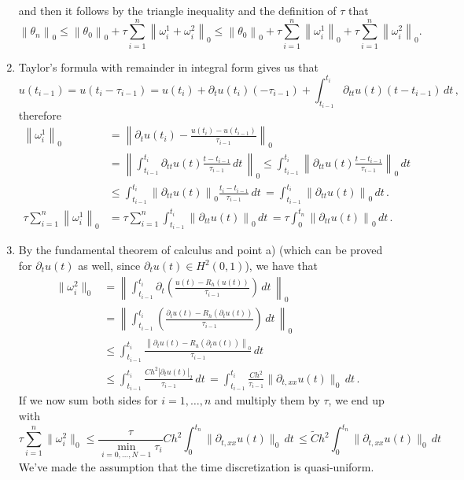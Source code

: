 \documentclass[a4paper]{article}
\newcommand{\dt}{\, dt \,}
\newcommand{\norm}[1]{\left\lVert #1 \right\rVert}
\begin{document}
\begin{enumerate}[label=\textbf{\alph*)},leftmargin=*]
\[	\]
	and then it follows by the triangle inequality and the definition of $\tau$ that
	\[
	\norm{\theta_n}_0
	\leq \norm{\theta_0}_0 + \tau\sum_{i=1}^n \norm{\omega_i^1 + \omega_i^2}_0
	\leq \norm{\theta_0}_0 + \tau\sum_{i=1}^n \norm{\omega_i^1}_0
		+ \tau\sum_{i=1}^n \norm{\omega_i^2}_0.
	\]
\item Taylor's formula with remainder in integral form gives us that
	\[
	u(t_{i-1})
	= u(t_i-\tau_{i-1})
	= u(t_i) + \partial_t u(t_i)(-\tau_{i-1})
		+ \int_{t_{i-1}}^{t_i} \partial_{tt} u(t) (t-t_{i-1}) \dt,
	\]
	therefore
	\begin{align*}
	\norm{\omega_i^1}_0
&	= \norm{\partial_t u(t_i)-\frac{u(t_i)-u(t_{i-1})}{\tau_{i-1}}}_0 \\
&	= \norm{\int_{t_{i-1}}^{t_i} \partial_{tt} u(t) \frac{t-t_{i-1}}{\tau_{i-1}} \dt}_0
	\leq \int_{t_{i-1}}^{t_i}
		\norm{\partial_{tt} u(t) \frac{t-t_{i-1}}{\tau_{i-1}}}_0 \dt \\
&	\leq \int_{t_{i-1}}^{t_i} \norm{\partial_{tt} u(t)}_0
		\frac{t_i-t_{i-1}}{\tau_{i-1}} \dt
	= \int_{t_{i-1}}^{t_i} \norm{\partial_{tt} u(t)}_0 \dt. \\
	\tau \sum_{i=1}^n \norm{\omega_i^1}_0
&	= \tau \sum_{i=1}^n \int_{t_{i-1}}^{t_i} \norm{\partial_{tt} u(t)}_0 \dt
	= \tau \int_0^{t_n} \norm{\partial_{tt} u(t)}_0 \dt.
	\end{align*}
\item By the fundamental theorem of calculus and point a) (which can be proved for
	$\partial_t u(t)$ as well, since $\partial_t u(t) \in H^2(0,1)$), we have that
	\begin{align*}
	\|\omega^2_i\|_0
&	= \norm{ \int^{t_i}_{t_{i-1}} \partial_t
		\left( \frac{u(t)-R_h(u(t))}{\tau_{i-1}} \right) \dt}_0 \\
&	= \norm{ \int^{t_i}_{t_{i-1}} 
		\left( \frac{\partial_t u(t)-R_h(\partial_t u(t))}{\tau_{i-1}} \right) \dt}_0 \\
&	\leq \int^{t_i}_{t_{i-1}} 
		 \frac{\norm{\partial_t u(t)-R_h(\partial_t u(t))}_0} {\tau_{i-1}} \dt \\
&	\leq\int^{t_i}_{t_{i-1}} \frac{Ch^2|\partial_t u(t)|_2}{\tau_{i-1}} \dt
	=\int^{t_i}_{t_{i-1}}\frac{Ch^2}{\tau_{i-1}}\|\partial_{t,xx}u(t)\|_0 \dt.
	\end{align*}
	If we now sum both sides for $i = 1,\dots,n$ and multiply them by $\tau$,
	we end up with
	\[
	\tau\sum^n_{i=1}\|\omega^2_i\|_0
	\leq\frac{\tau}{\min_{i=0,\dots,N-1}\tau_i}
		Ch^2\int^{t_n}_0\|\partial_{t,xx}u(t)\|_0 \dt
	\leq \tilde{C} h^2\int^{t_n}_0\|\partial_{t,xx}u(t)\|_0 \dt
	\]
	We've made the assumption that the time discretization is quasi-uniform.

\end{enumerate}
\end{document}
